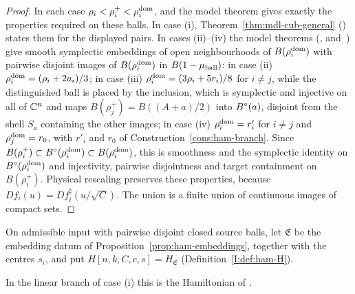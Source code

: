 \begin{proof}
In each case $\rho_i<\rho_i^+<\rho_i^{\rm dom}$, and the model theorem gives exactly the properties required on these
balls. In case (i), Theorem~\ref{thm:mdl-cub-general} () states them for the
displayed pairs. In cases (ii)--(iv) the model
theorems (,  and~) give smooth symplectic embeddings
of open neighbourhoods of $B(\rho_i^{\rm dom})$ with pairwise disjoint images of $B(\rho_i^{\rm dom})$ in $B(1-\mu_{\rm ball})$: in
case (ii) $\rho_i^{\rm dom}=(\rho_i+2a_i)/3$; in case (iii) $\rho_i^{\rm dom}=(3\rho_i+5r_i)/8$ for $i\ne j$, while the
distinguished ball is placed by the inclusion, which is symplectic and injective on all of $\mathbb{C}^n$ and maps
$B(\rho_j^+)=B((A+a)/2)$ into $B^{\circ}(a)$, disjoint from the shell $S_a$ containing the other images; in case (iv)
$\rho_i^{\rm dom}=r'_i$ for $i\ne j$ and $\rho_j^{\rm dom}=r_0$, with $r'_i$ and $r_0$ of Construction~\ref{cons:ham-branch}. Since $B(\rho_i^+)\subset B^{\circ}(\rho_i^{\rm dom})\subset B(\rho_i^{\rm dom})$,
this is smoothness and the symplectic identity on $B^{\circ}(\rho_i^{\rm dom})$ and injectivity, pairwise disjointness and
target containment on $B(\rho_i^+)$. Physical rescaling preserves these properties, because
$Df_i(u)=Df_i^\natural(u/\sqrt C)$. The union is a finite union of continuous images of compact sets.
\end{proof}


\begin{definition}\label{def:ham-H-final}
On admissible input with pairwise disjoint closed source balls, let $\mathfrak E$ be the embedding datum of
Proposition~\ref{prop:ham-embeddings}, together with the centres $s_i$, and put
$H[n,k,C,c,s]=H_{\mathfrak E}$ (Definition~\ref{I:def:ham-H}).
\end{definition}

In the linear branch of case (i) this is the Hamiltonian of .

